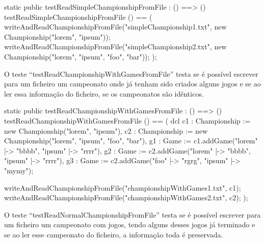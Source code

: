 \begin{vdm_al}  
    static public testReadSimpleChampionshipFromFile : () ==> ()
    testReadSimpleChampionshipFromFile () == (
      writeAndReadChampionshipFromFile("simpleChampionship1.txt",
        new Championship({"lorem", "ipsum"}));
      writeAndReadChampionshipFromFile("simpleChampionship2.txt",
        new Championship({"lorem", "ipsum", "foo", "bar"}));
    );
\end{vdm_al}

O teste ``testReadChampionshipWithGamesFromFile'' testa se é possível
escrever para um ficheiro um campeonato onde já tenham sido criados
alguns jogos e se ao ler essa informação do ficheiro, se os
campeonatos são idênticos.

\begin{vdm_al}  
    static public testReadChampionshipWithGamesFromFile : () ==> ()
    testReadChampionshipWithGamesFromFile () == (
      dcl c1 : Championship := new Championship({"lorem", "ipsum"}),
        c2 : Championship := new Championship({"lorem", "ipsum", "foo", "bar"}),
        g1 : Game := c1.addGame({"lorem" |-> "bbbb", "ipsum" |-> "rrrr"}),
        g2 : Game := c2.addGame({"lorem" |-> "bbbb", "ipsum" |-> "rrrr"}),
        g3 : Game := c2.addGame({"foo" |-> "rgrg", "ipsum" |-> "mymy"});
  
        writeAndReadChampionshipFromFile("championshipWithGames1.txt", c1);
        writeAndReadChampionshipFromFile("championshipWithGames2.txt", c2);
      );
\end{vdm_al}

O teste ``testReadNormalChampionshipFromFile'' testa se é possível
escrever para um ficheiro um campeonato com jogos, tendo alguns desses
jogos já terminado e se ao ler esse campeonato do ficheiro, a
informação toda é preservada.

